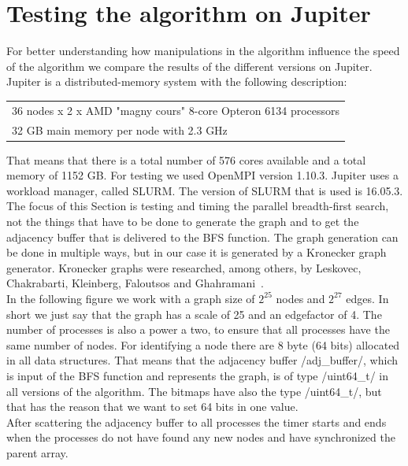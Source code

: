 \documentclass[12pt,a4paper]{article}
\begin{document}
\section{Testing the algorithm on Jupiter}
\label{sec:testing}

For better understanding how manipulations in the algorithm influence the speed of the algorithm we compare the results of the different versions on Jupiter.
Jupiter is a distributed-memory system with the following description:
\begin{flushleft}
\begin{tabular}{| l |}
  \hline
  36 nodes x 2 x AMD "magny cours" 8-core Opteron 6134 processors \\
  32 GB main memory per node with 2.3 GHz\\
  \hline
\end{tabular}
\end{flushleft}
That means that there is a total number of 576 cores available and a total memory of 1152 GB. For testing we used OpenMPI version 1.10.3. Jupiter uses a workload manager, called SLURM. The version of SLURM that is used is 16.05.3.\\
The focus of this Section is testing and timing the parallel breadth-first search, not the things that have to be done to generate the graph and to get the adjacency buffer that is delivered to the BFS function. The graph generation can be done in multiple ways, but in our case it is generated by a Kronecker graph generator. Kronecker graphs were researched, among others, by Leskovec, Chakrabarti, Kleinberg, Faloutsos and Ghahramani~\cite{kronecker}.\\
In the following figure we work with a graph size of \(2^{25}\) nodes and \(2^{27}\) edges. In short we just say that the graph has a scale of 25 and an edgefactor of 4. The number of processes is also a power a two, to ensure that all processes have the same number of nodes. For identifying a node there are 8 byte (64 bits) allocated in all data structures. That means that the adjacency buffer \cinline/adj_buffer/, which is input of the BFS function and represents the graph, is of type \cinline/uint64_t/ in all versions of the algorithm. The bitmaps have also the type \cinline/uint64_t/, but that has the reason that we want to set 64 bits in one value.\\
After scattering the adjacency buffer to all processes the timer starts and ends when the processes do not have found any new nodes and have synchronized the parent array.
\end{document}
